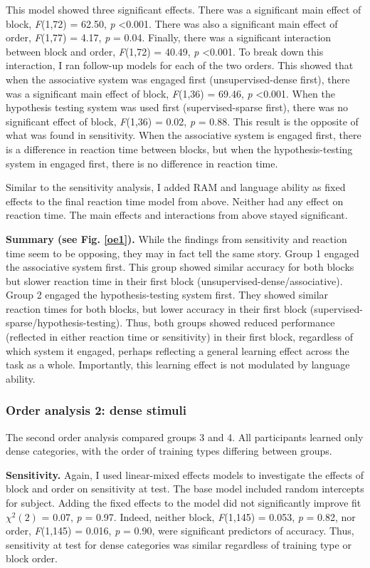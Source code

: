 \documentclass[../dissertation.tex]{subfiles}
\begin{document}
	This model showed three significant effects. There was a significant main effect of block, \textit{F}(1,72) = 62.50, \textit{p} \textless 0.001. There was also a significant main effect of order, \textit{F}(1,77) = 4.17, \textit{p} = 0.04. Finally, there was a significant interaction between block and order, \textit{F}(1,72) = 40.49, \textit{p} \textless 0.001. To break down this interaction, I ran follow-up models for each of the two orders. This showed that when the associative system was engaged first (unsupervised-dense first), there was a significant main effect of block, \textit{F}(1,36) = 69.46, \textit{p} \textless 0.001. When the hypothesis testing system was used first (supervised-sparse first), there was no significant effect of block, \textit{F}(1,36) = 0.02, \textit{p} = 0.88. This result is the opposite of what was found in sensitivity. When the associative system is engaged first, there is a difference in reaction time between blocks, but when the hypothesis-testing system in engaged first, there is no difference in reaction time. \par
	Similar to the sensitivity analysis, I added RAM and language ability as fixed effects to the final reaction time model from above. Neither had any effect on reaction time. The main effects and interactions from above stayed significant. \par 
	\textbf{Summary (see Fig. \ref{oe1}).} While the findings from sensitivity and reaction time seem to be opposing, they may in fact tell the same story. Group 1 engaged the associative system first. This group showed similar accuracy for both blocks but slower reaction time in their first block (unsupervised-dense/associative). Group 2 engaged the hypothesis-testing system first. They showed similar reaction times for both blocks, but lower accuracy in their first block (supervised-sparse/hypothesis-testing). Thus, both groups showed reduced performance (reflected in either reaction time or sensitivity) in their first block, regardless of which system it engaged, perhaps reflecting a general learning effect across the task as a whole. Importantly, this learning effect is not modulated by language ability.

\subsubsection{Order analysis 2: dense stimuli}

	The second order analysis compared groups 3 and 4. All participants learned only dense categories, with the order of training types differing between groups. \par
	\textbf{Sensitivity.} Again, I used linear-mixed effects models to investigate the effects of block and order on sensitivity at test. The base model included random intercepts for subject. Adding the fixed effects to the model did not significantly improve fit $\chi^{2}(2)$ = 0.07,  \textit{p} = 0.97. Indeed, neither block, \textit{F}(1,145) = 0.053, \textit{p} = 0.82, nor order, \textit{F}(1,145) = 0.016, \textit{p} = 0.90, were significant predictors of accuracy. Thus, sensitivity at test for dense categories was similar regardless of training type or block order.
	
\end{document}
